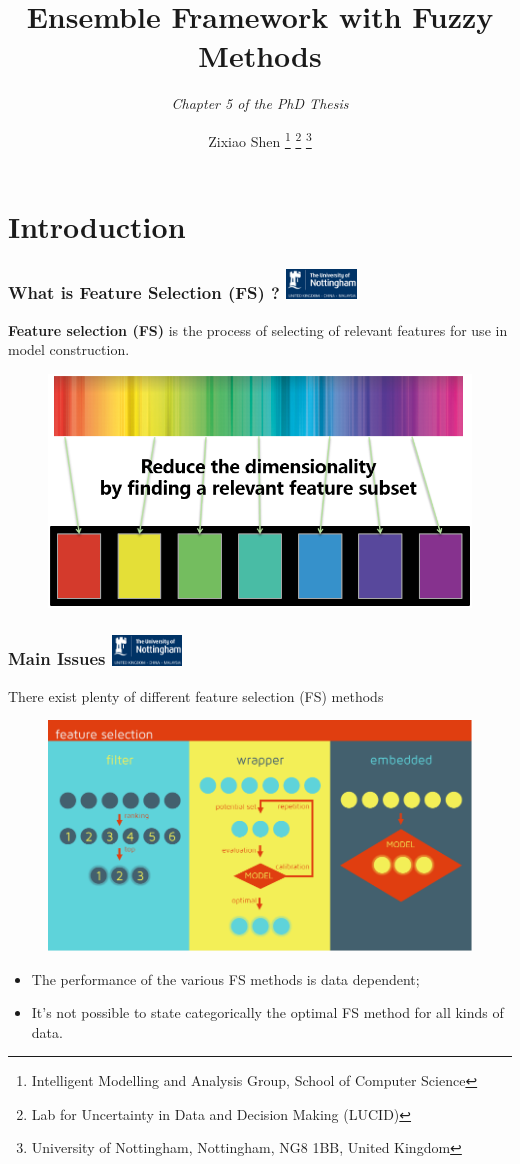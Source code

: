 \documentclass[aspectratio=1610]{beamer}
\title{Ensemble Framework with Fuzzy Methods\\}
\subtitle{\textit{Chapter 5 of the PhD Thesis}}
\author{Zixiao Shen
	\footnote{\label{1} Intelligent Modelling and Analysis Group, School of Computer Science}
	\footnote{\label{2} Lab for Uncertainty in Data and Decision Making (LUCID)}
	\footnote{\label{3} University of Nottingham, Nottingham, NG8 1BB, United Kingdom}}
\institute{Presented by:\\ 
            Zixiao Shen\\
            2$^\text{nd}$ Oct 2020}
\date{\textit{\tiny{\url{}}}}
\newcommand{\UoN}
  {\hfill {\includegraphics[height=0.8cm]{nott_logo/nott_logo_white.png}}}
\begin{document}
\begin{frame}
  \titlepage
\end{frame}

\section{Introduction}

\begin{frame}
\frametitle{What is Feature Selection (FS) ? \UoN}

\textbf{Feature selection (FS)} is the process of selecting of relevant features for use in model construction. 

	\begin{figure}
		\includegraphics[scale=0.6]{Figures/Feature_Selection.png}
	\end{figure}

\end{frame}



\begin{frame}
\frametitle{Main Issues \UoN}
	There exist plenty of different feature selection (FS) methods

	\begin{figure}
	\includegraphics[scale=0.4]{Figures/FS_Methods.png}
	\end{figure}

	\begin{itemize}
		\item The performance of the various FS methods is data dependent;
		\item It's not possible to state categorically the optimal FS method for all kinds of data.
	\end{itemize}
\end{frame}
\end{document}
